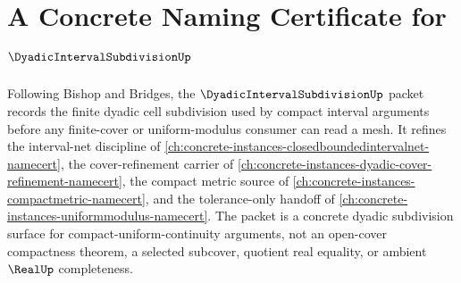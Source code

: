 \chapter{A Concrete Naming Certificate for $\DyadicIntervalSubdivisionUp$}
\label{ch:concrete-instances-dyadic-interval-subdivision-namecert}

Following Bishop and Bridges, the $\DyadicIntervalSubdivisionUp$ packet records the finite dyadic cell subdivision used by compact interval arguments before any finite-cover or uniform-modulus consumer can read a mesh. It refines the interval-net discipline of \autoref{ch:concrete-instances-closedboundedintervalnet-namecert}, the cover-refinement carrier of \autoref{ch:concrete-instances-dyadic-cover-refinement-namecert}, the compact metric source of \autoref{ch:concrete-instances-compactmetric-namecert}, and the tolerance-only handoff of \autoref{ch:concrete-instances-uniformmodulus-namecert}. The packet is a concrete dyadic subdivision surface for compact-uniform-continuity arguments, not an open-cover compactness theorem, a selected subcover, quotient real equality, or ambient $\RealUp$ completeness.

